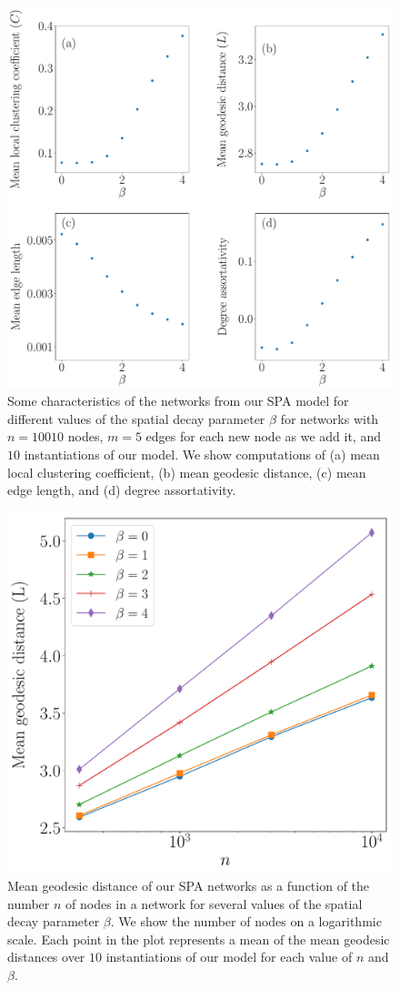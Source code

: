 \documentclass[%
 reprint,
 amsmath,amssymb,
 aps,
]{revtex4-1}
\begin{document}
\begin{figure}
    \centering
    \includegraphics[width=1.0\linewidth]{preferential_attachment_metrics.pdf}
    \caption{Some characteristics of the networks from our SPA model for different values of the spatial decay parameter $\beta$ for networks with $n=10010$ nodes, $m=5$ edges for each new node as we add it, and $10$ instantiations of our model. We show computations of (a) mean local clustering coefficient, (b) mean geodesic distance, (c) mean edge length, and (d) degree assortativity.
    }
\end{figure}


\begin{figure}
    \centering
    \includegraphics[width=0.75\linewidth]{PA_log_geodesic.pdf}
    \caption{Mean geodesic distance of our SPA networks as a function of the number $n$ of nodes in a network for several values of the spatial decay parameter $\beta$. We show the number of nodes on a logarithmic scale. Each point in the plot represents a mean of the mean geodesic distances over $10$ instantiations of our model for each value of $n$ and $\beta$.
    }
    \label{fig:PA_geodesic}
\end{figure}
\end{document}
